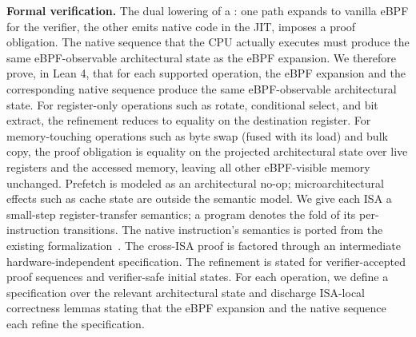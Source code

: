 

\noindent\textbf{Formal verification.}\label{sec:formal-verification}
The dual lowering of a \lang: one path expands to vanilla eBPF for the verifier, the other emits native code in the JIT, imposes a proof obligation.
The native sequence that the CPU actually executes must produce the same eBPF-observable architectural state as the eBPF expansion.
We therefore prove, in Lean 4, that for each supported \lang operation, the eBPF expansion and the corresponding native sequence produce the same eBPF-observable architectural state.
For register-only operations such as rotate, conditional select, and bit extract, the refinement reduces to equality on the destination register.
For memory-touching operations such as byte swap (fused with its load) and bulk copy, the proof obligation is equality on the projected architectural state over live registers and the accessed memory, leaving all other eBPF-visible memory unchanged.
Prefetch is modeled as an architectural no-op; microarchitectural effects such as cache state are outside the semantic model.
We give each ISA a small-step register-transfer semantics; a program denotes the fold of its per-instruction transitions.
The native instruction’s semantics is ported from the existing formalization~\cite{lnsym}.
The cross-ISA proof is factored through an intermediate hardware-independent specification.
The refinement is stated for verifier-accepted proof sequences and verifier-safe initial states.
For each \lang operation, we define a specification over the relevant architectural state and discharge ISA-local correctness lemmas stating that the eBPF expansion and the native sequence each refine the specification.
